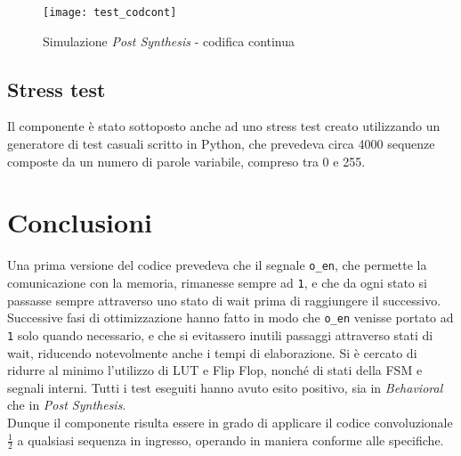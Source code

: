 \documentclass{article}
\begin{document}
\newpage

\begin{figure}[H]
    \centering
    \texttt{[image: test\_codcont]}
    \caption{Simulazione \emph{Post Synthesis} - codifica continua}
    \label{fig:codcont}
\end{figure}

\subsection{Stress test}
Il componente è stato sottoposto anche ad uno stress test creato utilizzando un generatore di test casuali scritto in Python, che prevedeva circa 4000 sequenze composte da un numero di parole variabile, compreso tra 0 e 255.


\vspace{2cm}
\section{Conclusioni}
Una prima versione del codice prevedeva che il segnale \verb^o_en^, che permette la comunicazione con la memoria, rimanesse sempre ad \verb^1^, e che da ogni stato si passasse sempre attraverso uno stato di wait prima di raggiungere il successivo.
Successive fasi di ottimizzazione hanno fatto in modo che \verb^o_en^ venisse portato ad \verb^1^ solo quando necessario, e che si evitassero inutili passaggi attraverso stati di wait, riducendo notevolmente anche i tempi di elaborazione.
Si è cercato di ridurre al minimo l'utilizzo di LUT e Flip Flop, nonché di stati della FSM e segnali interni.
Tutti i test eseguiti hanno avuto esito positivo, sia in \emph{Behavioral} che in \emph{Post Synthesis}.
\\Dunque il componente risulta essere in grado di applicare il codice convoluzionale $\frac{1}{2}$ a qualsiasi sequenza in ingresso, operando in maniera conforme alle specifiche.
\end{document}
